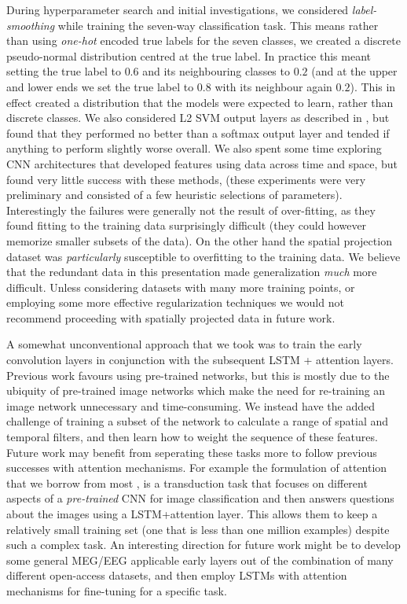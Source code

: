\documentclass[fleqn,10pt]{wlscirep}
\begin{document}
During hyperparameter search and initial investigations, we considered {\em label-smoothing} \cite{Pereyra2017} while training the seven-way classification task. This means rather than using {\em one-hot} encoded true labels for the seven classes, we created a discrete pseudo-normal distribution centred at the true label. In practice this meant setting the true label to $0.6$ and its neighbouring classes to $0.2$ (and at the upper and lower ends we set the true label to $0.8$ with its neighbour again $0.2$). This in effect created a distribution that the models were expected to learn, rather than discrete classes. We also considered L2 SVM output layers as described in \cite{Tang2013a}, but found that they performed no better than a softmax output layer and tended if anything to perform slightly worse overall. We also spent some time exploring CNN architectures that developed features using data across time and space, but found very little success with these methods, (these experiments were very preliminary and consisted of a few heuristic selections of parameters). Interestingly the failures were generally not the result of over-fitting, as they found fitting to the training data surprisingly difficult (they could however memorize smaller subsets of the data). On the other hand the spatial projection dataset was {\em particularly} susceptible to overfitting to the training data. We believe that the redundant data in this presentation made generalization {\em much} more difficult. Unless considering datasets with many more training points, or employing some more effective regularization techniques we would not recommend proceeding with spatially projected data in future work. 

A somewhat unconventional approach that we took was to train the early convolution layers in conjunction with the subsequent LSTM + attention layers. Previous work favours using pre-trained networks, but this is mostly due to the ubiquity of pre-trained image networks which make the need for re-training an image network unnecessary and time-consuming. We instead have the added challenge of training a subset of the network to calculate a range of spatial and temporal filters, and then learn how to weight the sequence of these features. Future work may benefit from seperating these tasks more to follow previous successes with attention mechanisms. For example the formulation of attention that we borrow from most \cite{Zhu}, is a transduction task that focuses on different aspects of a {\em pre-trained} CNN for image classification and then answers questions about the images using a LSTM+attention layer. This allows them to keep a relatively small training set (one that is less than one million examples) despite such a complex task. An interesting direction for future work might be to develop some general MEG/EEG applicable early layers out of the combination of many different open-access datasets, and then employ LSTMs with attention mechanisms for fine-tuning for a specific task.
\end{document}
